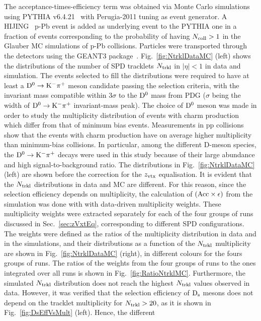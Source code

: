 The acceptance-times-efficiency term was obtained via Monte Carlo simulations
using PYTHIA v6.4.21~\cite{Sjostrand:2006za} with Perugia-2011 tuning as event generator.  
A HIJING~\cite{Wang:1991hta} p-Pb event is added as underlying event to the PYTHIA
one in a fraction of events corresponding to the probability of having $N_{\rm coll}>1$ in the
Glauber MC simulations of p-Pb collisions. 
Particles were transported through the detectors using the GEANT3 package~\cite{Brun:1994aa}.
Fig.~\ref{fig:NtrklDataMC} (left) shows the distributions of the number of SPD tracklets $N_{\rm trkl}$ in $|\eta|<1$ in data and simulation.
The events selected to fill the distributions were required to have at least a ${\rm D^0\to K^-\pi^+}$ meson candidate 
passing the selection criteria, with the invariant mass compatible within 3$\sigma$ to the ${\rm D^0}$ mass from PDG 
($\sigma$ being the width of ${\rm D^0\to K^-\pi^+}$ invariant-mass peak).
The choice of ${\rm D^0}$ meson was made in order to study the multiplicity distribution
of events with charm production which differ from that of minimum bias events.
Measurements in pp collisions~\cite{AguilarBenitez:1988js} show that the events with charm production
have on average higher multiplicity than minimum-bias collisions.
In particular, among the different D-meson species, the ${\rm D^0\to K^-\pi^+}$ decays
were used in this study because of their large abundance and high signal-to-background ratio.
The distributions in Fig.~\ref{fig:NtrklDataMC} (left) are shown before the correction for the $z_{\rm vtx}$ equalisation. 
It is evident that the $N_{\rm trkl}$ distributions in data and MC are different.
For this reason, since the selection efficiency depends on multiplicity, the calculation
of $({\rm Acc} \times \epsilon)$ from the simulation was done with 
with data-driven multiplicity weights. These multiplicity weights were extracted
separately for each of the four groups of runs discussed in Sec.~\ref{sec:zVxtEq},
corresponding to different SPD configurations.
The weights were defined as the ratios of the multiplicity distribution in data and in 
the simulations, and their distributions as a function of the $N_{\rm trkl}$ multiplicity are shown in Fig.~\ref{fig:NtrklDataMC} (right), in 
different colours for the fours groups of runs. The ratios of the weights from the four groups of runs to the ones integrated over
all runs is shown in Fig.~\ref{fig:RatioNtrklMC}.
Furthermore, the simulated $N_{\rm trkl}$ distribution does not reach the highest 
$N_{\rm trkl}$ values observed in data. However, it was verified 
that the selection efficiency of ${\rm D_s}$ mesons does not depend on
the tracklet multiplicity for $N_{\rm trkl} > 20$, as it is shown in Fig.~\ref{fig:DsEffVsMult} (left). Hence, the different
